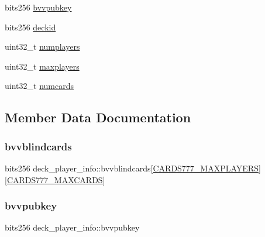 \begin{DoxyCompactItemize}
\item 
bits256 \hyperlink{structdeck__player__info_ada2129496132e81e7a4ca7ec2586226e}{bvvpubkey}
\item 
bits256 \hyperlink{structdeck__player__info_aa88dd303072d38aa72f735ea385fbbc6}{deckid}
\item 
uint32\+\_\+t \hyperlink{structdeck__player__info_a07a5c22a6eb96173dd6cbd0262ad6968}{numplayers}
\item 
uint32\+\_\+t \hyperlink{structdeck__player__info_a28099f450784fc67babc668315a61318}{maxplayers}
\item 
uint32\+\_\+t \hyperlink{structdeck__player__info_a1f07b1a6921a7a2c1055a47ff6dc8ae0}{numcards}
\end{DoxyCompactItemize}


\subsection{Member Data Documentation}
\mbox{\label{structdeck__player__info_a8c853de455fc2b5289789287a025cb05}} 
\subsubsection{\texorpdfstring{bvvblindcards}{bvvblindcards}}
{\footnotesize\ttfamily bits256 deck\+\_\+player\+\_\+info\+::bvvblindcards\mbox{[}\hyperlink{common_8h_a97d6188fd175f4ea7268e9445107a7c0}{C\+A\+R\+D\+S777\+\_\+\+M\+A\+X\+P\+L\+A\+Y\+E\+RS}\mbox{]}\mbox{[}\hyperlink{common_8h_a90f0ea2d767ac1915e44acb24a1fe1bd}{C\+A\+R\+D\+S777\+\_\+\+M\+A\+X\+C\+A\+R\+DS}\mbox{]}}

\mbox{\label{structdeck__player__info_ada2129496132e81e7a4ca7ec2586226e}} 
\subsubsection{\texorpdfstring{bvvpubkey}{bvvpubkey}}
{\footnotesize\ttfamily bits256 deck\+\_\+player\+\_\+info\+::bvvpubkey}

\mbox{\label{structdeck__player__info_aace068630cb6fbc45a944df6d533e91e}} 
